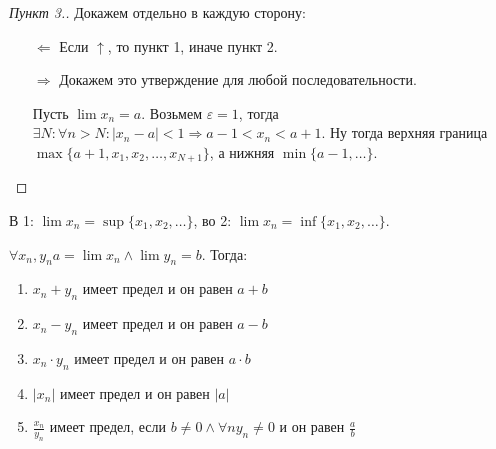 \begin{proof}[Пункт 3.]
    Докажем отдельно в каждую сторону:
    \begin{itemize}
        \item[$\Leftarrow$]Если $\uparrow$, то пункт 1, иначе  пункт 2.
        \item[$\Rightarrow$]Докажем это утверждение для любой последовательности.

            Пусть $\lim x_n = a$. Возьмем  $\varepsilon = 1$, тогда  $\exists N: \forall n > N: |x_n-a| < 1 \Rightarrow a-1<x_n<a+1$. Ну тогда верхняя граница $\max\{a+1,x_1,x_2,\ldots, x_{N+1}\}$, а нижняя $\min\{a-1,\ldots\}$.
    \end{itemize}
\end{proof}
\begin{remark}
    В 1: $\lim x_n = \sup\{x_1,x_2,\ldots\}$, во 2: $\lim x_n = \inf\{x_1,x_2,\ldots\}$.
\end{remark}
\begin{theorem}
    $\forall x_n, y_n a = \lim x_n \land \lim y_n = b$. Тогда: 
     \begin{enumerate}
         \item $x_n+y_n$ имеет предел и он равен  $a+b$
         \item $x_n-y_n$ имеет предел и он равен  $a-b$
         \item $x_n \cdot y_n$ имеет предел и он равен  $a \cdot b$
         \item $|x_n|$ имеет предел и он равен  $|a|$
         \item $\frac{x_n}{y_n}$ имеет предел, если $b \neq 0 \land \forall n y_n \neq 0$ и он  равен  $\frac{a}{b}$
    \end{enumerate}
\end{theorem}
